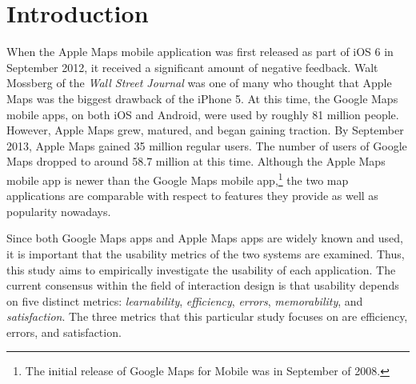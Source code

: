\documentclass[a4paper; 11pt]{article}
\begin{document}
\section{Introduction}
When the Apple Maps mobile application was first released as part of iOS 6 in September 2012, it received a significant amount of negative feedback. Walt Mossberg of the \textit{Wall Street Journal} was one of many who thought that Apple Maps was the biggest drawback of the iPhone 5.\cite{Mossberg} At this time, the Google Maps mobile apps, on both iOS and Android, were used by roughly 81 million people.\cite{ComScore} However, Apple Maps grew, matured, and began gaining traction. By September 2013, Apple Maps gained 35 million regular users. The number of users of Google Maps dropped to around 58.7 million at this time.\cite{ComScore} Although the Apple Maps mobile app is newer than the Google Maps mobile app,\footnote{The initial release of Google Maps for Mobile was in September of 2008.} the two map applications are comparable with respect to features they provide as well as popularity nowadays.
\medskip
\par
Since both Google Maps apps and Apple Maps apps are widely known and used, it is important that the usability metrics of the two systems are examined. Thus, this study aims to empirically investigate the usability of each application. The current consensus within the field of interaction design is that usability depends on five distinct metrics: \textit{learnability}, \textit{efficiency}, \textit{errors}, \textit{memorability}, and \textit{satisfaction}.\cite{Nielsen} The three metrics that this particular study focuses on are efficiency, errors, and satisfaction.
\end{document}
